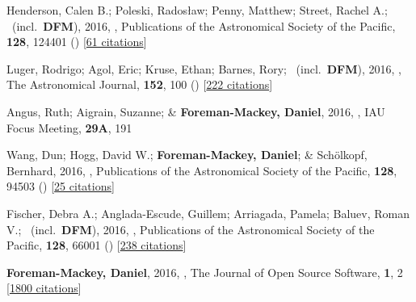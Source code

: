 \item[{\color{numcolor}\scriptsize22}] Henderson, Calen B.; Poleski, Rados{\l}aw; Penny, Matthew; Street, Rachel A.; \etal\ (incl.\ \textbf{DFM}), 2016, , Publications of the Astronomical Society of the Pacific, \textbf{128}, 124401 () [\href{https://ui.adsabs.harvard.edu/abs/2016PASP..128l4401H}{61 citations}]

\item[{\color{numcolor}\scriptsize21}] Luger, Rodrigo; Agol, Eric; Kruse, Ethan; Barnes, Rory; \etal\ (incl.\ \textbf{DFM}), 2016, , The Astronomical Journal, \textbf{152}, 100 () [\href{https://ui.adsabs.harvard.edu/abs/2016AJ....152..100L}{222 citations}]

\item[{\color{numcolor}\scriptsize20}] Angus, Ruth; Aigrain, Suzanne; \& \textbf{Foreman-Mackey, Daniel}, 2016, , IAU Focus Meeting, \textbf{29A}, 191

\item[{\color{numcolor}\scriptsize19}] Wang, Dun; Hogg, David W.; \textbf{Foreman-Mackey, Daniel}; \& Sch{\"o}lkopf, Bernhard, 2016, , Publications of the Astronomical Society of the Pacific, \textbf{128}, 94503 () [\href{https://ui.adsabs.harvard.edu/abs/2016PASP..128i4503W}{25 citations}]

\item[{\color{numcolor}\scriptsize18}] Fischer, Debra A.; Anglada-Escude, Guillem; Arriagada, Pamela; Baluev, Roman V.; \etal\ (incl.\ \textbf{DFM}), 2016, , Publications of the Astronomical Society of the Pacific, \textbf{128}, 66001 () [\href{https://ui.adsabs.harvard.edu/abs/2016PASP..128f6001F}{238 citations}]

\item[{\color{numcolor}\scriptsize17}] \textbf{Foreman-Mackey, Daniel}, 2016, , The Journal of Open Source Software, \textbf{1}, 2 [\href{https://scholar.google.com/scholar?cites=1835087844145558435,17325274697099535179,14220488595059618709,12820425635803494730,7284810048757141243,17415935839493019063}{1800 citations}]

